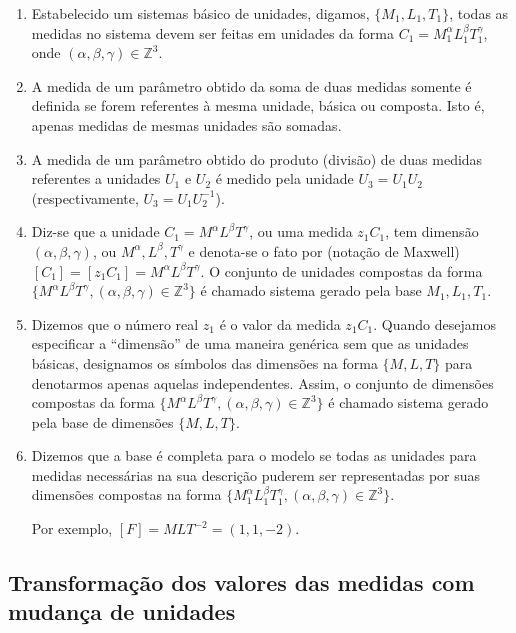\begin{enumerate}
\item Estabelecido um sistemas básico de unidades, digamos, \(\{M_1, L_1, T_1\}\), todas as medidas no sistema devem ser feitas em unidades da forma \(C_1 = M_1^{\alpha} L_1^{\beta} T_1^{\gamma}\), onde \((\alpha, \beta, \gamma) \in \mathbb{Z}^3\).
\item A medida de um parâmetro obtido da soma de duas medidas somente é definida se forem referentes à mesma unidade, básica ou composta. Isto é, apenas medidas de mesmas unidades são somadas.
\item A medida de um parâmetro obtido do produto (divisão) de duas medidas referentes a unidades \(U_1\) e \(U_2\) é medido pela unidade \(U_3 = U_1 U_2\) (respectivamente, \(U_3 = U_1 U_2^{-1}\)).
\item Diz-se que a unidade \(C_1 = M^{\alpha} L^{\beta} T^{\gamma}\), ou uma medida \(z_1C_1\), tem dimensão \((\alpha, \beta, \gamma)\), ou \(M^{\alpha}, L^{\beta}, T^{\gamma}\) e denota-se o fato por (notação de Maxwell) \([C_1] = [z_1C_1] = M^{\alpha} L^{\beta} T^{\gamma}\). O conjunto de unidades compostas da forma \(\{M^{\alpha} L^{\beta} T^{\gamma}, (\alpha, \beta, \gamma) \in \mathbb{Z}^3\}\) é chamado sistema gerado pela base \(M_1, L_1, T_1\).
\item Dizemos que o número real \(z_1\) é o valor da medida \(z_1C_1\). Quando desejamos especificar a ``dimensão'' de uma maneira genérica sem que as unidades básicas, designamos os símbolos das dimensões na forma \(\{M, L, T\}\) para denotarmos apenas aquelas independentes. Assim, o conjunto de dimensões compostas da forma \(\{M^{\alpha} L^{\beta} T^{\gamma}, (\alpha, \beta, \gamma) \in \mathbb{Z}^3\}\) é chamado sistema gerado pela base de dimensões \(\{M, L, T\}\).
\item Dizemos que a base é completa para o modelo se todas as unidades para medidas necessárias na sua descrição puderem ser representadas por suas dimensões compostas na forma \(\{M_{1}^{\alpha} L_{1}^{\beta} T_{1}^{\gamma}, (\alpha, \beta, \gamma) \in \mathbb{Z}^3\}\).

Por exemplo, \([F] = MLT^{-2} = (1, 1, -2)\).
\end{enumerate}






\subsection{Transformação dos valores das medidas com mudança de unidades}

